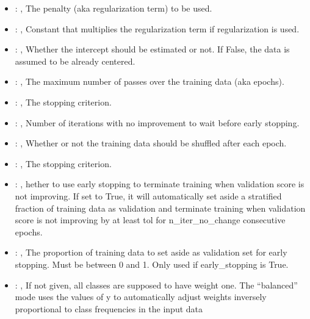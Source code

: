 \begin{itemize}
    \item {}: \xmlDesc{[l2,  l1, elasticnet]}, 
      The penalty (aka regularization term) to be used.

    \item {}: , 
      Constant that multiplies the regularization term if regularization is used.

    \item {}: , 
      Whether the intercept should be estimated or not. If False,
      the data is assumed to be already centered.

    \item {}: , 
      The maximum number of passes over the training data (aka epochs).

    \item {}: , 
      The stopping criterion.

    \item {}: , 
      Number of iterations with no improvement to wait before early stopping.

    \item {}: , 
      Whether or not the training data should be shuffled after each epoch.

    \item {}: , 
      The stopping criterion.

    \item {}: , 
      hether to use early stopping to terminate training when validation score is not
      improving. If set to True, it will automatically set aside a stratified fraction of training
      data as validation and terminate training when validation score is not improving by at least
      tol for n\_iter\_no\_change consecutive epochs.

    \item {}: , 
      The proportion of training data to set aside as validation set for early stopping.
      Must be between 0 and 1. Only used if early\_stopping is True.

    \item {}: \xmlDesc{[balanced]}, 
      If not given, all classes are supposed to have weight one.
      The “balanced” mode uses the values of y to automatically adjust weights
      inversely proportional to class frequencies in the input data


\end{itemize}
